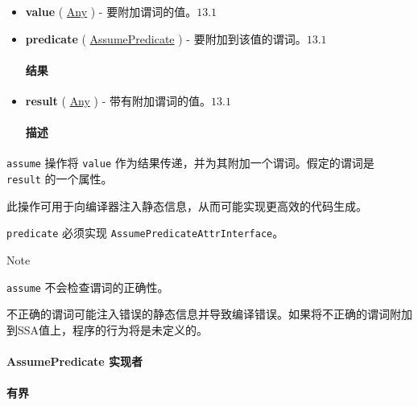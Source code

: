 \documentclass{article}
\begin{document}
\begin{itemize}
\item \textbf{value} ( \href{https://docs.nvidia.com/cuda/tile-ir/latest/sections/operations.html#type-any}{Any} ) - 要附加谓词的值。$\boxed{13.1}$
\item \textbf{predicate} ( \href{https://docs.nvidia.com/cuda/tile-ir/latest/sections/operations.html#op-attribute-cuda-tile-assume-assumepredicate-attr}{AssumePredicate} ) - 要附加到该值的谓词。$\boxed{13.1}$




\paragraph{结果}


\item \textbf{result} ( \href{https://docs.nvidia.com/cuda/tile-ir/latest/sections/operations.html#type-any}{Any} ) - 带有附加谓词的值。$\boxed{13.1}$




\paragraph{描述}


\end{itemize}
\texttt{assume} 操作将 \texttt{value} 作为结果传递，并为其附加一个谓词。假定的谓词是 \texttt{result} 的一个属性。



此操作可用于向编译器注入静态信息，从而可能实现更高效的代码生成。



\texttt{predicate} 必须实现 \texttt{AssumePredicateAttrInterface}。



Note




\texttt{assume} 不会检查谓词的正确性。

不正确的谓词可能注入错误的静态信息并导致编译错误。如果将不正确的谓词附加到SSA值上，程序的行为将是未定义的。





\paragraph{AssumePredicate 实现者}




\paragraph{有界}
\end{document}
